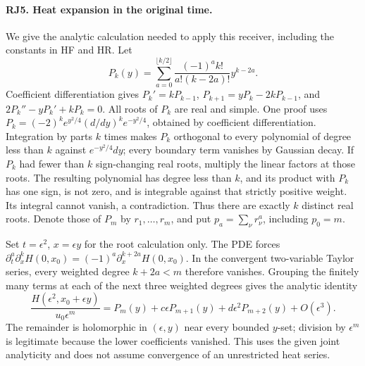 \paragraph{RJ5. Heat expansion in the original time.}
We give the analytic calculation needed to apply this receiver,
including the constants in HF and HR. Let
\[
 P_k(y)=\sum_{a=0}^{\lfloor k/2\rfloor}
       \frac{(-1)^ak!}{a!(k-2a)!}y^{k-2a}.
 \tag{RJ12}
\]
Coefficient differentiation gives
$P_k'=kP_{k-1}$,
$P_{k+1}=yP_k-2kP_{k-1}$, and
$2P_k''-yP_k'+kP_k=0$.
All roots of $P_k$ are real and simple. One proof uses
$P_k=(-2)^ke^{y^2/4}(d/dy)^ke^{-y^2/4}$, obtained by coefficient
differentiation. Integration by parts $k$ times makes $P_k$
orthogonal to every polynomial of degree less than $k$ against
$e^{-y^2/4}dy$; every boundary term vanishes by Gaussian decay.
If $P_k$ had fewer than $k$ sign-changing real roots, multiply the
linear factors at those roots. The resulting polynomial has degree
less than $k$, and its product with $P_k$ has one sign, is not zero,
and is integrable against that strictly positive weight. Its integral
cannot vanish, a contradiction. Thus there are exactly $k$ distinct
real roots. Denote those of $P_m$ by $r_1,\ldots,r_m$, and put
$p_a=\sum_\nu r_\nu^a$, including $p_0=m$.

Set $t=\epsilon^2$, $x=\epsilon y$ for the root calculation only.
The PDE forces
$\partial_t^a\partial_x^kH(0,x_0)=(-1)^a
\partial_x^{k+2a}H(0,x_0)$.
In the convergent two-variable Taylor series, every weighted degree
$k+2a<m$ therefore vanishes. Grouping the finitely many terms at each
of the next three weighted degrees gives the analytic identity
\[
 \frac{H(\epsilon^2,x_0+\epsilon y)}{u_0\epsilon^m}
   =P_m(y)+c\epsilon P_{m+1}(y)
        +d\epsilon^2P_{m+2}(y)+O(\epsilon^3).
 \tag{RJ13}
\]
The remainder is holomorphic in $(\epsilon,y)$ near every bounded
$y$-set; division by $\epsilon^m$ is legitimate because the lower
coefficients vanished. This uses the given joint analyticity and
does not assume convergence of an unrestricted heat series.

